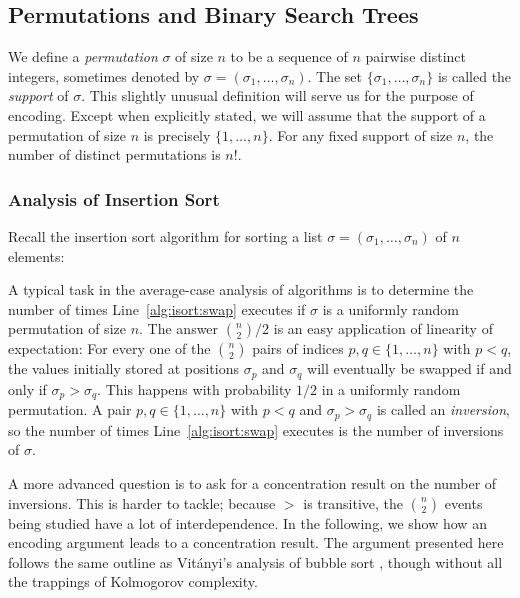 \documentclass[format=acmsmall, review=false, screen=true]{acmart}
\begin{document}
\subsection{Permutations and Binary Search Trees}

We define a \emph{permutation} $\sigma$ of size $n$ to be a sequence
of $n$ pairwise distinct integers, sometimes denoted by
$\sigma = (\sigma_1, \dots, \sigma_n)$. The set
$\{\sigma_1, \dots, \sigma_n\}$ is called the
\emph{support} of $\sigma$. This slightly unusual
definition will serve us for the purpose of encoding. Except when
explicitly stated, we will assume that the support of a permutation
of size $n$
is precisely $\{1, \dots, n\}$. For any fixed support of
size $n$, the number of distinct permutations 
is $n!$.

\subsubsection{Analysis of Insertion Sort}

Recall the insertion sort algorithm for sorting a list
$\sigma = (\sigma_1,\ldots,\sigma_n)$ of $n$ elements:

\begin{algorithmic}[1]
         \label{alg:isort:swap}
     \ENDWHILE
  \ENDFOR
\end{algorithmic}

A typical task in the average-case analysis of algorithms is to
determine the number of times Line~\ref{alg:isort:swap} executes 
if $\sigma$ is a
uniformly random permutation of size $n$.  The answer
$\binom{n}{2}/2$ is an easy application of linearity of expectation:
For every one of the $\binom{n}{2}$ pairs of indices 
$p,q\in\{1,\dots,n\}$ with
$p<q$, the values initially stored at positions $\sigma_p$ and
$\sigma_q$ will eventually be swapped if and only if
$\sigma_p > \sigma_q$. This happens with probability $1/2$ in a
uniformly random permutation. A pair $p, q \in \{1, \dots, n\}$ with
$p < q$ and $\sigma_p > \sigma_q$ is called an
\emph{inversion}, so the number of times Line~\ref{alg:isort:swap} 
executes is the number
of inversions of $\sigma$.

A more advanced question is to ask for a concentration result on the
number of inversions. This is harder to tackle; because $>$
is transitive, the $\binom{n}{2}$ events being studied have a lot of
interdependence. In the following, we show how an encoding argument
leads to a concentration result.  The argument
presented here follows the same outline as Vit\'{a}nyi's analysis of
bubble sort \cite{vitanyi:analysis}, though without all the trappings
of Kolmogorov complexity.
\end{document}
